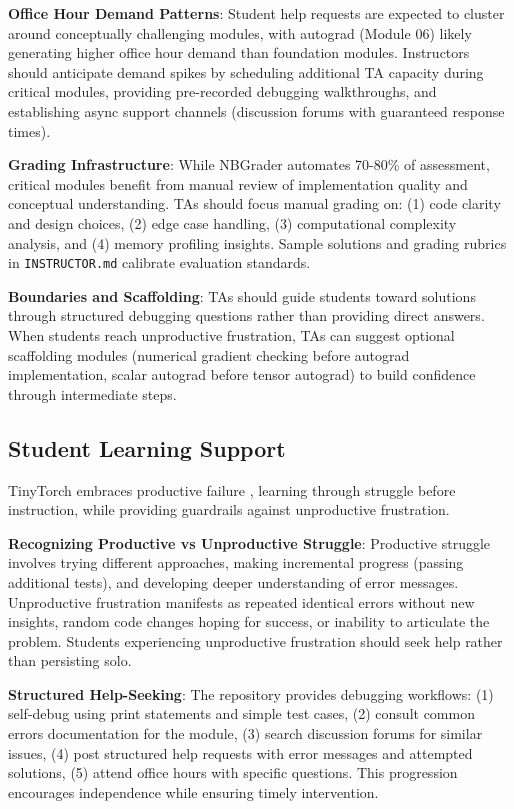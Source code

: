 \documentclass[10pt,twocolumn]{article}
\begin{document}
\textbf{Office Hour Demand Patterns}: Student help requests are expected to cluster around conceptually challenging modules, with autograd (Module 06) likely generating higher office hour demand than foundation modules. Instructors should anticipate demand spikes by scheduling additional TA capacity during critical modules, providing pre-recorded debugging walkthroughs, and establishing async support channels (discussion forums with guaranteed response times).

\textbf{Grading Infrastructure}: While NBGrader automates 70-80\% of assessment, critical modules benefit from manual review of implementation quality and conceptual understanding. TAs should focus manual grading on: (1) code clarity and design choices, (2) edge case handling, (3) computational complexity analysis, and (4) memory profiling insights. Sample solutions and grading rubrics in \texttt{INSTRUCTOR.md} calibrate evaluation standards.

\textbf{Boundaries and Scaffolding}: TAs should guide students toward solutions through structured debugging questions rather than providing direct answers. When students reach unproductive frustration, TAs can suggest optional scaffolding modules (numerical gradient checking before autograd implementation, scalar autograd before tensor autograd) to build confidence through intermediate steps.

\subsection{Student Learning Support}
\label{subsec:student-support}

TinyTorch embraces productive failure \citep{kapur2008}, learning through struggle before instruction, while providing guardrails against unproductive frustration.

\textbf{Recognizing Productive vs Unproductive Struggle}: Productive struggle involves trying different approaches, making incremental progress (passing additional tests), and developing deeper understanding of error messages. Unproductive frustration manifests as repeated identical errors without new insights, random code changes hoping for success, or inability to articulate the problem. Students experiencing unproductive frustration should seek help rather than persisting solo.

\textbf{Structured Help-Seeking}: The repository provides debugging workflows: (1) self-debug using print statements and simple test cases, (2) consult common errors documentation for the module, (3) search discussion forums for similar issues, (4) post structured help requests with error messages and attempted solutions, (5) attend office hours with specific questions. This progression encourages independence while ensuring timely intervention.
\end{document}
